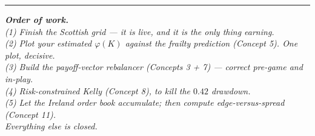\documentclass[11pt,a4paper]{article}
\begin{document}
\vfill
\begin{center}\rule{0.45\textwidth}{0.4pt}\end{center}
\begin{center}\small\itshape
\textbf{Order of work.}\\
(1) Finish the Scottish grid --- it is live, and it is the only thing earning.\\
(2) Plot your estimated $\varphi(K)$ against the frailty prediction (Concept 5). One plot, decisive.\\
(3) Build the payoff-vector rebalancer (Concepts 3 + 7) --- correct pre-game \emph{and} in-play.\\
(4) Risk-constrained Kelly (Concept 8), to kill the $0.42$ drawdown.\\
(5) Let the Ireland order book accumulate; then compute edge-versus-spread (Concept 11).\\
Everything else is closed.
\end{center}
\end{document}

